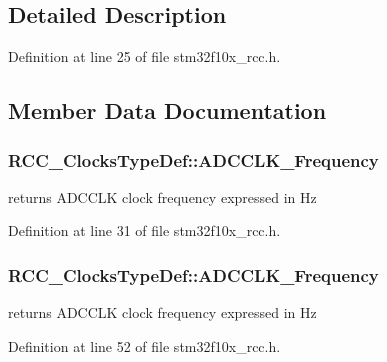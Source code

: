 \subsection{Detailed Description}


Definition at line 25 of file stm32f10x\+\_\+rcc.\+h.



\subsection{Member Data Documentation}
\subsubsection[{\texorpdfstring{A\+D\+C\+C\+L\+K\+\_\+\+Frequency}{ADCCLK_Frequency}}]{ R\+C\+C\+\_\+\+Clocks\+Type\+Def\+::\+A\+D\+C\+C\+L\+K\+\_\+\+Frequency}\hypertarget{struct_r_c_c___clocks_type_def_a19aad23ee1910372dd8e6c563010dcbb}{}\label{struct_r_c_c___clocks_type_def_a19aad23ee1910372dd8e6c563010dcbb}
returns A\+D\+C\+C\+LK clock frequency expressed in Hz 

Definition at line 31 of file stm32f10x\+\_\+rcc.\+h.

\subsubsection[{\texorpdfstring{A\+D\+C\+C\+L\+K\+\_\+\+Frequency}{ADCCLK_Frequency}}]{ R\+C\+C\+\_\+\+Clocks\+Type\+Def\+::\+A\+D\+C\+C\+L\+K\+\_\+\+Frequency}\hypertarget{struct_r_c_c___clocks_type_def_aa3dad8af3bb364b6232cf5446d478e7d}{}\label{struct_r_c_c___clocks_type_def_aa3dad8af3bb364b6232cf5446d478e7d}
returns A\+D\+C\+C\+LK clock frequency expressed in Hz 

Definition at line 52 of file stm32f10x\+\_\+rcc.\+h.

